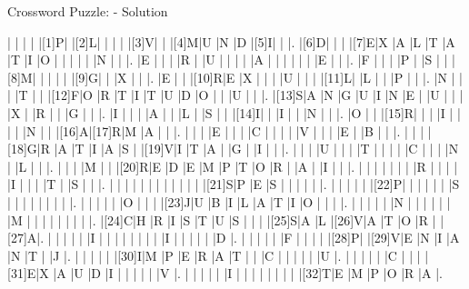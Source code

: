 \documentclass[12pt]{article}
\begin{document}
\begin{center}
  \huge{Crossword Puzzle: - Solution}
\end{center}
\vspace{1.5cm}
\PuzzleSolution
\begin{Puzzle}{22}{25}
  |{}  |{}  |{}  |{}  |[1]P|{}  |[2]L|{}  |{}  |{}  |{}  |[3]V|{}  |{}  |[4]M|U   |N   |D   |[5]I|{}  |{}  |.
  |[6]D|{}  |{}  |{}  |[7]E|X   |A   |L   |T   |A   |T   |I   |O   |{}  |{}  |{}  |{}  |{}  |N   |{}  |{}  |.
  |E   |{}  |{}  |{}  |R   |{}  |U   |{}  |{}  |{}  |{}  |A   |{}  |{}  |{}  |{}  |{}  |{}  |E   |{}  |{}  |.
  |F   |{}  |{}  |{}  |P   |{}  |S   |{}  |{}  |[8]M|{}  |{}  |{}  |{}  |{}  |[9]G|{}  |{}  |X   |{}  |{}  |.
  |E   |{}  |{}  |[10]R|E   |X   |{}  |{}  |{}  |U   |{}  |{}  |{}  |[11]L|{}  |L   |{}  |{}  |P   |{}  |{}  |.
  |N   |{}  |{}  |{}  |T   |{}  |{}  |[12]F|O   |R   |T   |I   |T   |U   |D   |O   |{}  |{}  |U   |{}  |{}  |.
  |[13]S|A   |N   |G   |U   |I   |N   |E   |{}  |U   |{}  |{}  |{}  |X   |{}  |R   |{}  |{}  |G   |{}  |{}  |.
  |I   |{}  |{}  |{}  |A   |{}  |{}  |L   |{}  |S   |{}  |{}  |[14]I|{}  |{}  |I   |{}  |{}  |N   |{}  |{}  |.
  |O   |{}  |{}  |[15]R|{}  |{}  |{}  |I   |{}  |{}  |{}  |{}  |N   |{}  |{}  |[16]A|[17]R|M   |A   |{}  |{}  |.
  |{}  |{}  |{}  |E   |{}  |{}  |{}  |C   |{}  |{}  |{}  |{}  |V   |{}  |{}  |{}  |E   |{}  |B   |{}  |{}  |.
  |{}  |{}  |{}  |[18]G|R   |A   |T   |I   |A   |S   |{}  |[19]V|I   |T   |A   |{}  |G   |{}  |I   |{}  |{}  |.
  |{}  |{}  |{}  |U   |{}  |{}  |{}  |T   |{}  |{}  |{}  |{}  |C   |{}  |{}  |{}  |N   |{}  |L   |{}  |{}  |.
  |{}  |{}  |{}  |M   |{}  |{}  |[20]R|E   |D   |E   |M   |P   |T   |O   |R   |{}  |A   |{}  |I   |{}  |{}  |.
  |{}  |{}  |{}  |{}  |{}  |{}  |{}  |R   |{}  |{}  |{}  |{}  |I   |{}  |{}  |{}  |T   |{}  |S   |{}  |{}  |.
  |{}  |{}  |{}  |{}  |{}  |{}  |{}  |{}  |{}  |{}  |{}  |{}  |[21]S|P   |E   |S   |{}  |{}  |{}  |{}  |{}  |.
  |{}  |{}  |{}  |{}  |{}  |[22]P|{}  |{}  |{}  |{}  |{}  |{}  |S   |{}  |{}  |{}  |{}  |{}  |{}  |{}  |{}  |.
  |{}  |{}  |{}  |{}  |{}  |O   |{}  |{}  |{}  |[23]J|U   |B   |I   |L   |A   |T   |I   |O   |{}  |{}  |{}  |.
  |{}  |{}  |{}  |{}  |{}  |N   |{}  |{}  |{}  |{}  |{}  |{}  |M   |{}  |{}  |{}  |{}  |{}  |{}  |{}  |{}  |.
  |[24]C|H   |R   |I   |S   |T   |U   |S   |{}  |{}  |{}  |[25]S|A   |L   |[26]V|A   |T   |O   |R   |{}  |[27]A|.
  |{}  |{}  |{}  |{}  |{}  |I   |{}  |{}  |{}  |{}  |{}  |{}  |{}  |{}  |I   |{}  |{}  |{}  |{}  |{}  |D   |.
  |{}  |{}  |{}  |{}  |{}  |F   |{}  |{}  |{}  |{}  |[28]P|{}  |[29]V|E   |N   |I   |A   |N   |T   |{}  |J   |.
  |{}  |{}  |{}  |{}  |{}  |[30]I|M   |P   |E   |R   |A   |T   |{}  |{}  |C   |{}  |{}  |{}  |{}  |{}  |U   |.
  |{}  |{}  |{}  |{}  |{}  |C   |{}  |{}  |{}  |[31]E|X   |A   |U   |D   |I   |{}  |{}  |{}  |{}  |{}  |V   |.
  |{}  |{}  |{}  |{}  |{}  |I   |{}  |{}  |{}  |{}  |{}  |{}  |{}  |{}  |[32]T|E   |M   |P   |O   |R   |A   |.
\end{Puzzle}
\end{document}
